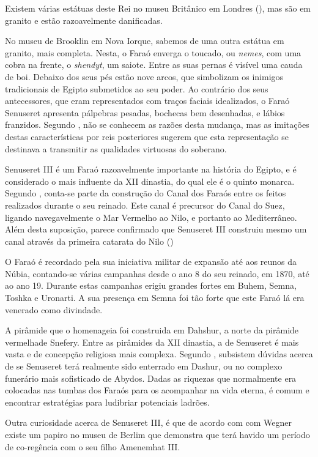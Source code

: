 \documentclass{article}
\begin{document}
Existem várias estátuas deste Rei no museu Britânico em Londres
(\cite{wiki-senuseret}), mas são em granito e estão razoavelmente
danificadas.

No museu de Brooklin em Nova Iorque, sabemos de uma outra estátua em
granito, mais completa. Nesta, o Faraó enverga o toucado, ou
\emph{nemes}, com uma cobra na frente, o \emph{shendyt}, um
saiote. Entre as suas pernas é visível uma cauda de boi. Debaixo dos
seus pés estão nove arcos, que simbolizam os inimigos tradicionais de
Egipto submetidos ao seu poder. Ao contrário dos seus antecessores,
que eram representados com traços faciais idealizados, o Faraó
Senuseret apresenta pálpebras pesadas, bochecas bem desenhadas, e
lábios franzidos. Segundo \cite{wiki-senuseret}, não se conhecem as
razões desta mudança, mas as imitações destas características por reis
posteriores sugerem que esta representação se destinava a transmitir
as qualidades virtuosas do soberano.

Senuseret III é um Faraó razoavelmente importante na história do
Egipto, e é considerado o mais influente da XII dinastia, do qual ele
é o quinto monarca. Segundo \cite{wiki-senuseret}, conta-se parte da
construção do Canal dos Faraós entre os feitos realizados durante o
seu reinado. Este canal é precursor do Canal do Suez, ligando
navegavelmente o Mar Vermelho ao Nilo, e portanto ao
Mediterrâneo. Além desta suposição, parece confirmado que Senuseret
III construiu mesmo um canal através da primeira catarata do Nilo
(\cite{wiki-breasted})

O Faraó é recordado pela sua iniciativa militar de expansão até aos
reunos da Núbia, contando-se várias campanhas desde o ano 8 do seu
reinado, em 1870, até ao ano 19. Durante estas campanhas erigiu
grandes fortes em Buhem, Semna, Toshka e Uronarti. A sua presença em
Semna foi tão forte que este Faraó lá era venerado como divindade.

A pirâmide que o homenageia foi construida em Dahshur, a norte da
pirâmide vermelhade Snefery. Entre as pirâmides da XII dinastia, a de
Senuseret é mais vasta e de concepção religiosa mais complexa. Segundo
\cite{wiki-wegner}, subsistem dúvidas acerca de se Senuseret terá
realmente sido enterrado em Dashur, ou no complexo funerário mais
sofisticado de Abydos. Dadas as riquezas que normalmente era colocadas
nas tumbas dos Faraós para os acompanhar na vida eterna, é comum e
encontrar estratégias para ludibriar potenciais ladrões.

Outra curiosidade acerca de Senuseret III, é que de acordo com com
Wegner existe um papiro no museu de Berlim que demonstra que terá
havido um período de co-regência com o seu filho Amenemhat III.
\end{document}
